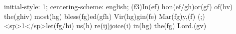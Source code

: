 initial-style: 1;
centering-scheme: english;
(f3)In(ef) hon(ef/gh)or(gf) of(hv) the(ghiv) most(hg) bless(fg)ed(gfh) Vir(hg)gin(fe) Mar(fg)y,(f) (;) <sp>1</sp>let(fg/hi) us(h) re(ij)joice(i) in(hg) the(fg) Lord.(gv)